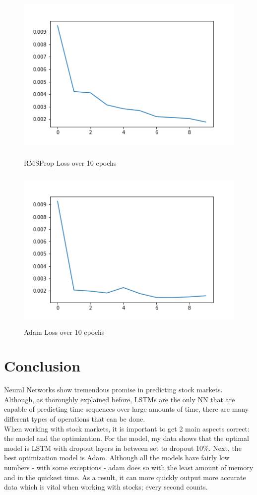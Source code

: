 \documentclass[12pt]{article}
\begin{document}
\begin{figure}
  \includegraphics[width=\linewidth, height=80mm]{images/rmsloss.png}
  \caption{RMSProp Loss over 10 epochs}
  
   \includegraphics[width=\linewidth, height=80mm]{images/adamloss.png}
  \caption{Adam Loss over 10 epochs}
\end{figure}


\section{Conclusion}\label{conclusions}
Neural Networks show tremendous promise in predicting stock markets. Although, as thoroughly explained before, LSTMs are the only NN that are capable of predicting time sequences over large amounts of time, there are many different types of operations that can be done. \\

When working with stock markets, it is important to get 2 main aspects correct: the model and the optimization. For the model, my data shows that the optimal model is LSTM with dropout layers in between set to dropout 10\%. Next, the best optimization model is Adam. Although all the models have fairly low numbers - with some exceptions - adam does so with the least amount of memory and in the quickest time. As a result, it can more quickly output more accurate data which is vital when working with stocks; every second counts. \\
\end{document}
